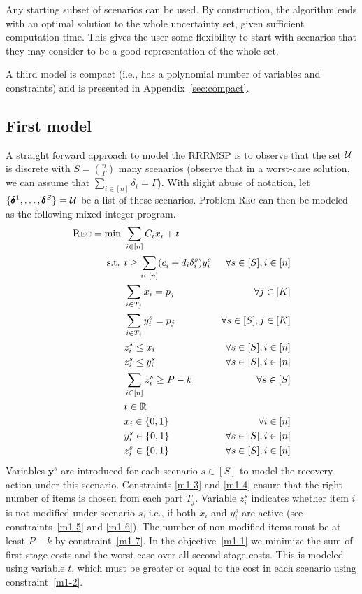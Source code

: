 Any starting subset of scenarios can be used. By construction, the algorithm ends with an optimal solution to the whole uncertainty set, given sufficient computation time. This gives the user some flexibility to start with scenarios that they may consider to be a good representation of the whole set.

A third model is compact (i.e., has a polynomial number of variables and constraints) and is presented in Appendix~\ref{sec:compact}.

\subsection{First model}
\label{sec:first}

A straight forward approach to model the RRRMSP is to observe that the set $\mathcal{U}$ is discrete with $S=\binom{n}{\Gamma}$ many scenarios (observe that in a worst-case solution, we can assume that $\sum_{i\in[n]} \delta_i = \Gamma$). With slight abuse of notation, let $\{ \pmb{\delta}^1,\ldots,\pmb{\delta}^S\} = \mathcal{U}$ be a list of these scenarios. Problem \textsc{Rec} can then be modeled as the following mixed-integer program.
\begin{subequations}
\label{eq:m1}  
\begin{align}
\textsc{Rec} = \min\ & \sum_{i\in [n]} C_i x_i + t \label{m1-1} \\
\text{s.t. } & t \ge \sum_{i\in[n]} (\underline{c}_i + d_i\delta^s_i) y^s_i & \forall s\in[S], i\in[n] \label{m1-2} \\
& \sum_{i\in T_j} x_i = p_j & \forall j\in[K] \label{m1-3} \\
& \sum_{i\in T_j} y^s_i = p_j & \forall s\in[S], j\in[K] \label{m1-4} \\
& z^s_i \le x_i & \forall s\in[S], i\in[n] \label{m1-5} \\
& z^s_i \le y^s_i & \forall s\in[S], i\in[n] \label{m1-6} \\
& \sum_{i\in[n]} z^s_i \ge P-k & \forall s\in[S] \label{m1-7} \\
& t \in \mathbb{R} \\
& x_i \in \{0,1\} & \forall i\in[n] \\
& y^s_i \in \{0,1\} & \forall s\in[S],i\in[n] \\
& z^s_i \in \{0,1\} & \forall s\in[S],i\in[n] \label{m1-end}
\end{align}
\end{subequations}
Variables $\pmb{y}^s$ are introduced for each scenario $s\in[S]$ to model the recovery action under this scenario. Constraints \eqref{m1-3} and \eqref{m1-4} ensure that the right number of items is chosen from each part $T_j$. Variable $z^s_i$ indicates whether item $i$ is not modified under scenario $s$, i.e., if both $x_i$ and $y^s_i$ are active (see constraints~\eqref{m1-5} and \eqref{m1-6}). The number of non-modified items must be at least $P-k$ by constraint~\eqref{m1-7}. In the objective~\eqref{m1-1} we minimize the sum of first-stage costs and the worst case over all second-stage costs. This is modeled using variable $t$, which must be greater or equal to the cost in each scenario using constraint~\eqref{m1-2}.



